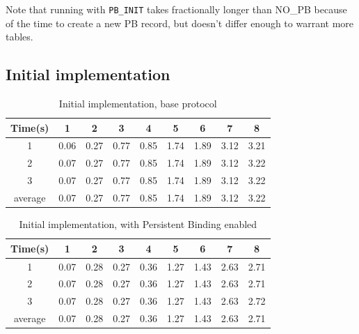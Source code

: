 \documentclass[12pt,a4paper]{article}
\begin{document}
Note that running with \verb|PB_INIT| takes fractionally longer than NO\_PB because of the time to create a new PB record, but doesn't differ enough to warrant more tables.

\subsection{Initial implementation}
\label{subsec:init_timings}

\begin{table} [ht]
\begin{center}
\begin{tabular}{|c|c|c|c|c|c|c|c|c|}
	\hline
	Time(s) & 1     & 2    & 3    & 4    & 5    & 6    & 7    & 8\\
	\hline
	1       & 0.06  & 0.27 & 0.77 & 0.85 & 1.74 & 1.89 & 3.12 & 3.21\\
	2       & 0.07  & 0.27 & 0.77 & 0.85 & 1.74 & 1.89 & 3.12 & 3.22\\
	3       & 0.07  & 0.27 & 0.77 & 0.85 & 1.74 & 1.89 & 3.12 & 3.22\\
	average & 0.07  & 0.27 & 0.77 & 0.85 & 1.74 & 1.89 & 3.12 & 3.22\\
	\hline
\end{tabular}
\caption{Initial implementation, base protocol}
\end{center}
\end{table}

\begin{table} [ht]
\begin{center}
\begin{tabular}{|c|c|c|c|c|c|c|c|c|}
	\hline
	Time(s) & 1     & 2    & 3    & 4    & 5    & 6    & 7    & 8\\
	\hline
	1       & 0.07  & 0.28 & 0.27 & 0.36 & 1.27 & 1.43 & 2.63 & 2.71\\
	2       & 0.07  & 0.28 & 0.27 & 0.36 & 1.27 & 1.43 & 2.63 & 2.71\\
	3       & 0.07  & 0.28 & 0.27 & 0.36 & 1.27 & 1.43 & 2.63 & 2.72\\
	average & 0.07  & 0.28 & 0.27 & 0.36 & 1.27 & 1.43 & 2.63 & 2.71\\
	\hline
\end{tabular}
\caption{Initial implementation, with Persistent Binding enabled}
\end{center}
\end{table}

\pagebreak
\end{document}
